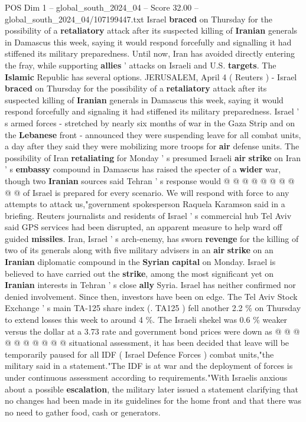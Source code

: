 \begin{textsample}{POS Dim 1 – global\_south\_2024\_04 – Score 32.00 – global\_south\_2024\_04/107199447.txt}  \label{ex:f1_pos_042}
Israel \textbf{braced} on Thursday for the possibility of a \textbf{retaliatory} attack after its suspected killing of \textbf{Iranian} generals in Damascus this week, saying it would respond forcefully and signalling it had stiffened its military preparedness.
Until now, Iran has avoided directly entering the fray, while supporting \textbf{allies} ' attacks on Israeli and U.S. \textbf{targets}.
The \textbf{Islamic} Republic has several options.
JERUSALEM, April 4 ( Reuters ) - Israel \textbf{braced} on Thursday for the possibility of a \textbf{retaliatory} attack after its suspected killing of \textbf{Iranian} generals in Damascus this week, saying it would respond forcefully and signaling it had stiffened its military preparedness.
Israel ' s armed forces - stretched by nearly six months of war in the Gaza Strip and on the \textbf{Lebanese} front - announced they were suspending leave for all combat units, a day after they said they were mobilizing more troops for \textbf{air} defense units.
The possibility of Iran \textbf{retaliating} for Monday ' s presumed Israeli \textbf{air} \textbf{strike} on Iran ' s \textbf{embassy} compound in Damascus has raised the specter of a \textbf{wider} war, though two \textbf{Iranian} sources said Tehran ' s response would @ @ @ @ @ @ @ @ @ @ of Israel is prepared for every scenario.
We will respond with force to any attempts to attack us,"government spokesperson Raquela Karamson said in a briefing.
Reuters journalists and residents of Israel ' s commercial hub Tel Aviv said GPS services had been disrupted, an apparent measure to help ward off guided \textbf{missiles}.
Iran, Israel ' s arch-enemy, has sworn \textbf{revenge} for the killing of two of its generals along with five military advisers in an \textbf{air} \textbf{strike} on an \textbf{Iranian} diplomatic compound in the \textbf{Syrian} \textbf{capital} on Monday.
Israel is believed to have carried out the \textbf{strike}, among the most significant yet on \textbf{Iranian} interests in Tehran ' s close \textbf{ally} Syria.
Israel has neither confirmed nor denied involvement.
Since then, investors have been on edge.
The Tel Aviv Stock Exchange ' s main TA-125 share index (.
TA125 ) fell another 2.2 \% on Thursday to extend losses this week to around 4 \%.
The Israeli shekel was 0.6 \% weaker versus the dollar at a 3.73 rate and government bond prices were down as @ @ @ @ @ @ @ @ @ @ situational assessment, it has been decided that leave will be temporarily paused for all IDF ( Israel Defence Forces ) combat units,"the military said in a statement."The IDF is at war and the deployment of forces is under continuous assessment according to requirements."With Israelis anxious about a possible \textbf{escalation}, the military later issued a statement clarifying that no changes had been made in its guidelines for the home front and that there was no need to gather food, cash or generators.

\end{textsample}
